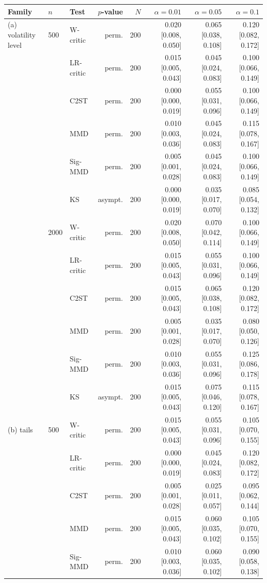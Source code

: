 \begin{tabular}{lllrrrrr}
\toprule
Family & $n$ & Test & $p$-value & $N$ & $\alpha=0.01$ & $\alpha=0.05$ & $\alpha=0.1$ \\
\midrule
(a) volatility level & 500 & W-critic & perm. & 200 & 0.020 [0.008, 0.050] & 0.065 [0.038, 0.108] & 0.120 [0.082, 0.172] \\
 &  & LR-critic & perm. & 200 & 0.015 [0.005, 0.043] & 0.045 [0.024, 0.083] & 0.100 [0.066, 0.149] \\
 &  & C2ST & perm. & 200 & 0.000 [0.000, 0.019] & 0.055 [0.031, 0.096] & 0.100 [0.066, 0.149] \\
 &  & MMD & perm. & 200 & 0.010 [0.003, 0.036] & 0.045 [0.024, 0.083] & 0.115 [0.078, 0.167] \\
 &  & Sig-MMD & perm. & 200 & 0.005 [0.001, 0.028] & 0.045 [0.024, 0.083] & 0.100 [0.066, 0.149] \\
 &  & KS & asympt. & 200 & 0.000 [0.000, 0.019] & 0.035 [0.017, 0.070] & 0.085 [0.054, 0.132] \\
 & 2000 & W-critic & perm. & 200 & 0.020 [0.008, 0.050] & 0.070 [0.042, 0.114] & 0.100 [0.066, 0.149] \\
 &  & LR-critic & perm. & 200 & 0.015 [0.005, 0.043] & 0.055 [0.031, 0.096] & 0.100 [0.066, 0.149] \\
 &  & C2ST & perm. & 200 & 0.015 [0.005, 0.043] & 0.065 [0.038, 0.108] & 0.120 [0.082, 0.172] \\
 &  & MMD & perm. & 200 & 0.005 [0.001, 0.028] & 0.035 [0.017, 0.070] & 0.080 [0.050, 0.126] \\
 &  & Sig-MMD & perm. & 200 & 0.010 [0.003, 0.036] & 0.055 [0.031, 0.096] & 0.125 [0.086, 0.178] \\
 &  & KS & asympt. & 200 & 0.015 [0.005, 0.043] & 0.075 [0.046, 0.120] & 0.115 [0.078, 0.167] \\
(b) tails & 500 & W-critic & perm. & 200 & 0.015 [0.005, 0.043] & 0.055 [0.031, 0.096] & 0.105 [0.070, 0.155] \\
 &  & LR-critic & perm. & 200 & 0.000 [0.000, 0.019] & 0.045 [0.024, 0.083] & 0.120 [0.082, 0.172] \\
 &  & C2ST & perm. & 200 & 0.005 [0.001, 0.028] & 0.025 [0.011, 0.057] & 0.095 [0.062, 0.144] \\
 &  & MMD & perm. & 200 & 0.015 [0.005, 0.043] & 0.060 [0.035, 0.102] & 0.105 [0.070, 0.155] \\
 &  & Sig-MMD & perm. & 200 & 0.010 [0.003, 0.036] & 0.060 [0.035, 0.102] & 0.090 [0.058, 0.138] \\

\end{tabular}
